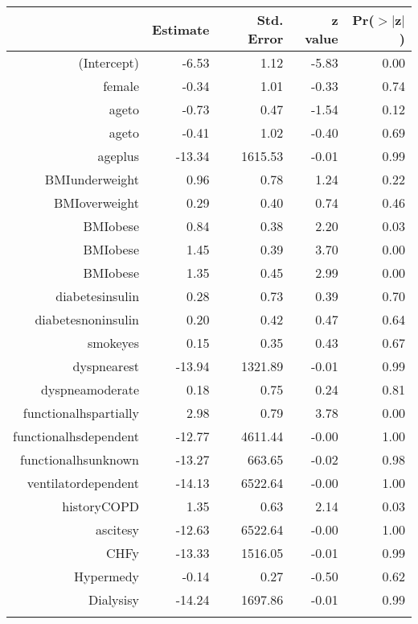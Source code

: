 
\bigskip\bigskip
\centering
\begin{tabular}{rrrrr}
  \hline
 & Estimate & Std. Error & z value & Pr($>$$|$z$|$) \\ 
  \hline
(Intercept) & -6.53 & 1.12 & -5.83 & 0.00 \\ 
  female & -0.34 & 1.01 & -0.33 & 0.74 \\ 
  age\-65\-to\-74 & -0.73 & 0.47 & -1.54 & 0.12 \\ 
  age\-75\-to\-84 & -0.41 & 1.02 & -0.40 & 0.69 \\ 
  age\-85\-plus & -13.34 & 1615.53 & -0.01 & 0.99 \\ 
  BMI\-underweight & 0.96 & 0.78 & 1.24 & 0.22 \\ 
  BMI\-overweight & 0.29 & 0.40 & 0.74 & 0.46 \\ 
  BMI\-obese\-1 & 0.84 & 0.38 & 2.20 & 0.03 \\ 
  BMI\-obese\-2 & 1.45 & 0.39 & 3.70 & 0.00 \\ 
  BMI\-obese\-3 & 1.35 & 0.45 & 2.99 & 0.00 \\ 
  diabetes\-insulin & 0.28 & 0.73 & 0.39 & 0.70 \\ 
  diabetes\-noninsulin & 0.20 & 0.42 & 0.47 & 0.64 \\ 
  smoke\-yes & 0.15 & 0.35 & 0.43 & 0.67 \\ 
  dyspnea\-rest & -13.94 & 1321.89 & -0.01 & 0.99 \\ 
  dyspnea\-moderate & 0.18 & 0.75 & 0.24 & 0.81 \\ 
  functional\-hs\-partially & 2.98 & 0.79 & 3.78 & 0.00 \\ 
  functional\-hs\-dependent & -12.77 & 4611.44 & -0.00 & 1.00 \\ 
  functional\-hs\-unknown & -13.27 & 663.65 & -0.02 & 0.98 \\ 
  ventilator\-dependent & -14.13 & 6522.64 & -0.00 & 1.00 \\ 
  history\-COPD & 1.35 & 0.63 & 2.14 & 0.03 \\ 
  ascites\-y & -12.63 & 6522.64 & -0.00 & 1.00 \\ 
  CHF\-y & -13.33 & 1516.05 & -0.01 & 0.99 \\ 
  Hyper\-med\-y & -0.14 & 0.27 & -0.50 & 0.62 \\ 
  Dialysis\-y & -14.24 & 1697.86 & -0.01 & 0.99 \\ 
$$
\end{tabular}
